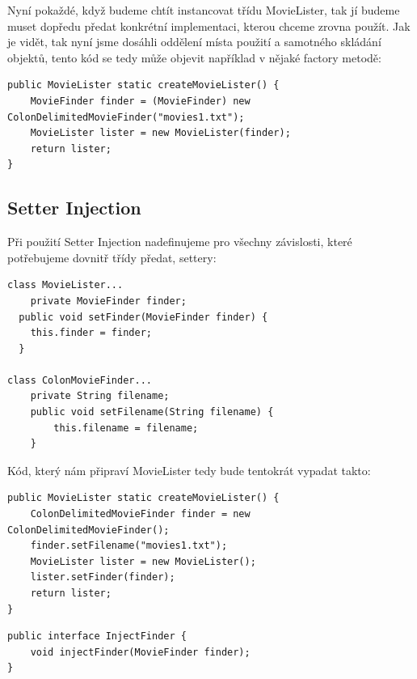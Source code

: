 \documentclass[a4paper,conference]{IEEEtran}
\begin{document}
Nyní pokaždé, když budeme chtít instancovat třídu MovieLister, tak jí budeme muset dopředu předat konkrétní implementaci, kterou chceme zrovna použít. Jak je vidět, tak nyní jsme dosáhli oddělení místa použití a samotného skládání objektů, tento kód se tedy může objevit například v nějaké factory metodě:

\lstset{language=Java, caption=Příklad použití ve factory metodě, label=listing:Java}
\begin{lstlisting}
public MovieLister static createMovieLister() {
    MovieFinder finder = (MovieFinder) new ColonDelimitedMovieFinder("movies1.txt");
    MovieLister lister = new MovieLister(finder);
    return lister;
}
\end{lstlisting}

\subsection{Setter Injection}

Při použití Setter Injection nadefinujeme pro všechny závislosti, které potřebujeme dovnitř třídy předat, settery:

\lstset{language=Java, caption=MovieLister a Setter Injection, label=listing:Java}
\begin{lstlisting}
class MovieLister...
    private MovieFinder finder;
  public void setFinder(MovieFinder finder) {
    this.finder = finder;
  }

class ColonMovieFinder...
    private String filename;
    public void setFilename(String filename) {
        this.filename = filename;
    }
\end{lstlisting}

Kód, který nám připraví MovieLister tedy bude tentokrát vypadat takto:

\lstset{language=Java, caption=MovieLister Setter Injection a factory metoda, label=listing:Java}
\begin{lstlisting}
public MovieLister static createMovieLister() {
    ColonDelimitedMovieFinder finder = new ColonDelimitedMovieFinder();
    finder.setFilename("movies1.txt");
    MovieLister lister = new MovieLister();
    lister.setFinder(finder);
    return lister;
}
\end{lstlisting}

\lstset{language=Java,caption=Interface pro interface injection,label=listing:Java}
\begin{lstlisting}
public interface InjectFinder {
    void injectFinder(MovieFinder finder);
}
\end{lstlisting}
\end{document}
